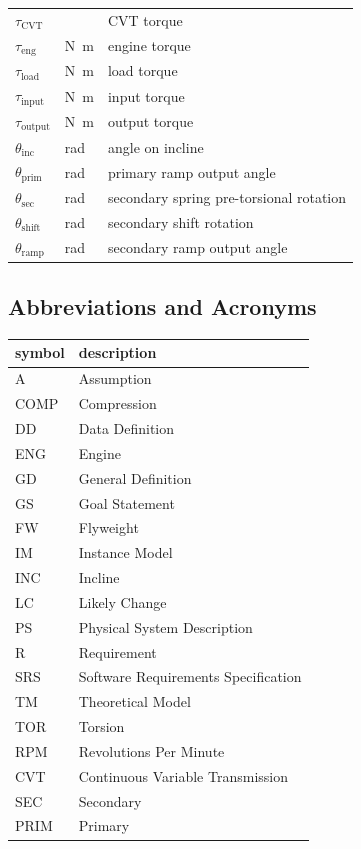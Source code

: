 \documentclass[12pt]{article}
\begin{document}
\begin{longtable*}{l l p{12cm}}
$\tau_{\text{CVT}}$ & \si[per-mode=symbol] {} & CVT torque \\
$\tau_{\text{eng}}$ & \si[per-mode=symbol] {\newton\metre} & engine torque \\
$\tau_{\text{load}}$ & \si[per-mode=symbol] {\newton\metre} & load torque \\
$\tau_{\text{input}}$ & \si[per-mode=symbol] {\newton\metre} & input torque \\
$\tau_{\text{output}}$ & \si[per-mode=symbol] {\newton\metre} & output torque \\
$\theta_{\text{inc}}$ & \si[per-mode=symbol] {\radian} & angle on incline \\
$\theta_{\text{prim}}$ & \si[per-mode=symbol] {\radian} & primary ramp output angle \\
$\theta_{\text{sec}}$ & \si[per-mode=symbol] {\radian} & secondary spring pre-torsional rotation \\
$\theta_{\text{shift}}$ & \si[per-mode=symbol] {\radian} & secondary shift rotation \\
$\theta_{\text{ramp}}$ & \si[per-mode=symbol] {\radian} & secondary ramp output angle \\
\bottomrule
\end{longtable*}

\subsection{Abbreviations and Acronyms}

\renewcommand{\arraystretch}{1.2}
\begin{tabular}{l l} 
  \toprule		
  \textbf{symbol} & \textbf{description}\\
  \midrule 
  A & Assumption\\
  COMP & Compression\\
  DD & Data Definition\\
  ENG & Engine \\
  GD & General Definition\\
  GS & Goal Statement\\
  FW & Flyweight\\
  IM & Instance Model\\
  INC & Incline\\
  LC & Likely Change\\
  PS & Physical System Description\\
  R & Requirement\\
  SRS & Software Requirements Specification\\
  TM & Theoretical Model\\
  TOR & Torsion\\
  RPM & Revolutions Per Minute\\
  CVT & Continuous Variable Transmission\\
  SEC & Secondary\\
  PRIM & Primary\\
  \bottomrule
\end{tabular}\\
\end{document}
